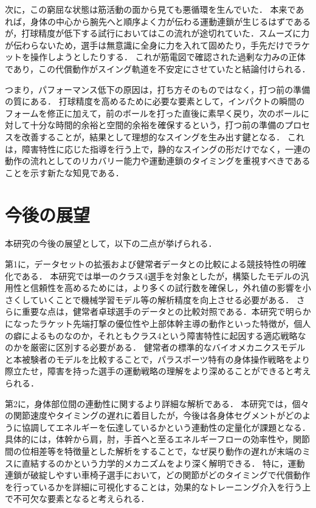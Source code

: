 \documentclass[../main]{subfiles}
\begin{document}
次に，この窮屈な状態は筋活動の面から見ても悪循環を生んでいた．
本来であれば，身体の中心から腕先へと順序よく力が伝わる運動連鎖が生じるはずであるが，打球精度が低下する試行においてはこの流れが途切れていた．スムーズに力が伝わらないため，選手は無意識に全身に力を入れて固めたり，手先だけでラケットを操作しようとしたりする．
これが筋電図で確認された過剰な力みの正体であり，この代償動作がスイング軌道を不安定にさせていたと結論付けられる．

つまり，パフォーマンス低下の原因は，打ち方そのものではなく，打つ前の準備の質にある．
打球精度を高めるために必要な要素として，インパクトの瞬間のフォームを修正に加えて，前のボールを打った直後に素早く戻り，次のボールに対して十分な時間的余裕と空間的余裕を確保するという，打つ前の準備のプロセスを改善することが，結果として理想的なスイングを生み出す鍵となる．
これは，障害特性に応じた指導を行う上で，静的なスイングの形だけでなく，一連の動作の流れとしてのリカバリー能力や運動連鎖のタイミングを重視すべきであることを示す新たな知見である．

\clearpage

\section{今後の展望}
\label{sec:conc_future}
本研究の今後の展望として，以下の二点が挙げられる．

第1に，データセットの拡張および健常者データとの比較による競技特性の明確化である．
本研究では単一のクラス4選手を対象としたが，構築したモデルの汎用性と信頼性を高めるためには，より多くの試行数を確保し，外れ値の影響を小さくしていくことで機械学習モデル等の解析精度を向上させる必要がある．
さらに重要な点は，健常者卓球選手のデータとの比較対照である．本研究で明らかになったラケット先端打撃の優位性や上部体幹主導の動作といった特徴が，個人の癖によるものなのか，それともクラス4という障害特性に起因する適応戦略なのかを厳密に区別する必要がある．
健常者の標準的なバイオメカニクスモデルと本被験者のモデルを比較することで，パラスポーツ特有の身体操作戦略をより際立たせ，障害を持った選手の運動戦略の理解をより深めることができると考えられる．

第2に，身体部位間の連動性に関するより詳細な解析である．
本研究では，個々の関節速度やタイミングの遅れに着目したが，今後は各身体セグメントがどのように協調してエネルギーを伝達しているかという連動性の定量化が課題となる．
具体的には，体幹から肩，肘，手首へと至るエネルギーフローの効率性や，関節間の位相差等を特徴量とした解析をすることで，なぜ戻り動作の遅れが末端のミスに直結するのかという力学的メカニズムをより深く解明できる．
特に，運動連鎖が破綻しやすい車椅子選手において，どの関節がどのタイミングで代償動作を行っているかを詳細に可視化することは，効果的なトレーニング介入を行う上で不可欠な要素となると考えられる．
\clearpage
\end{document}
